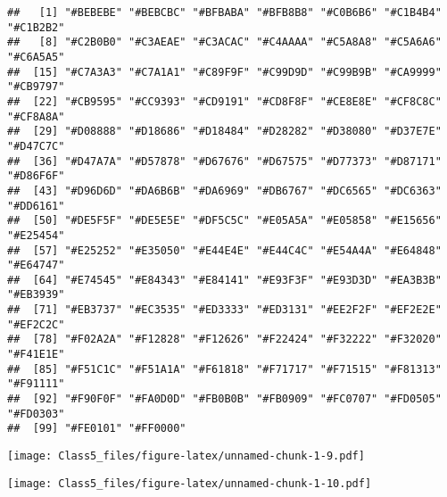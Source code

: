 \documentclass[]{article}
\newenvironment{Shaded}{\begin{snugshade}}{\end{snugshade}}
\newcommand{\KeywordTok}[1]{\textcolor[rgb]{0.13,0.29,0.53}{\textbf{#1}}}
\newcommand{\DataTypeTok}[1]{\textcolor[rgb]{0.13,0.29,0.53}{#1}}
\newcommand{\StringTok}[1]{\textcolor[rgb]{0.31,0.60,0.02}{#1}}
\newcommand{\CommentTok}[1]{\textcolor[rgb]{0.56,0.35,0.01}{\textit{#1}}}
\newcommand{\OperatorTok}[1]{\textcolor[rgb]{0.81,0.36,0.00}{\textbf{#1}}}
\newcommand{\NormalTok}[1]{#1}
\begin{document}
\begin{verbatim}
##   [1] "#BEBEBE" "#BEBCBC" "#BFBABA" "#BFB8B8" "#C0B6B6" "#C1B4B4" "#C1B2B2"
##   [8] "#C2B0B0" "#C3AEAE" "#C3ACAC" "#C4AAAA" "#C5A8A8" "#C5A6A6" "#C6A5A5"
##  [15] "#C7A3A3" "#C7A1A1" "#C89F9F" "#C99D9D" "#C99B9B" "#CA9999" "#CB9797"
##  [22] "#CB9595" "#CC9393" "#CD9191" "#CD8F8F" "#CE8E8E" "#CF8C8C" "#CF8A8A"
##  [29] "#D08888" "#D18686" "#D18484" "#D28282" "#D38080" "#D37E7E" "#D47C7C"
##  [36] "#D47A7A" "#D57878" "#D67676" "#D67575" "#D77373" "#D87171" "#D86F6F"
##  [43] "#D96D6D" "#DA6B6B" "#DA6969" "#DB6767" "#DC6565" "#DC6363" "#DD6161"
##  [50] "#DE5F5F" "#DE5E5E" "#DF5C5C" "#E05A5A" "#E05858" "#E15656" "#E25454"
##  [57] "#E25252" "#E35050" "#E44E4E" "#E44C4C" "#E54A4A" "#E64848" "#E64747"
##  [64] "#E74545" "#E84343" "#E84141" "#E93F3F" "#E93D3D" "#EA3B3B" "#EB3939"
##  [71] "#EB3737" "#EC3535" "#ED3333" "#ED3131" "#EE2F2F" "#EF2E2E" "#EF2C2C"
##  [78] "#F02A2A" "#F12828" "#F12626" "#F22424" "#F32222" "#F32020" "#F41E1E"
##  [85] "#F51C1C" "#F51A1A" "#F61818" "#F71717" "#F71515" "#F81313" "#F91111"
##  [92] "#F90F0F" "#FA0D0D" "#FB0B0B" "#FB0909" "#FC0707" "#FD0505" "#FD0303"
##  [99] "#FE0101" "#FF0000"
\end{verbatim}

\begin{Shaded}
\end{Shaded}

\texttt{[image: Class5\_files/figure-latex/unnamed-chunk-1-9.pdf]}

\begin{Shaded}
\end{Shaded}

\texttt{[image: Class5\_files/figure-latex/unnamed-chunk-1-10.pdf]}
\end{document}

